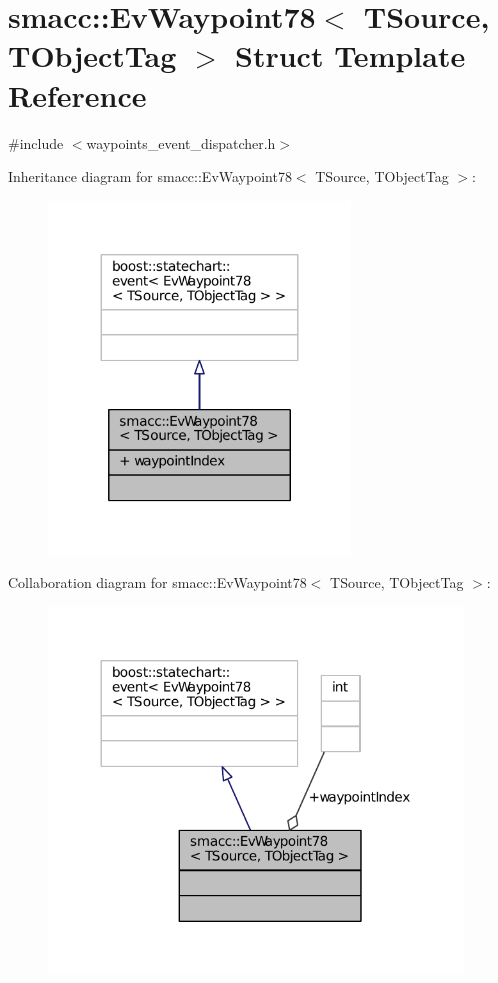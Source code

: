 \hypertarget{structsmacc_1_1EvWaypoint78}{}\section{smacc\+:\+:Ev\+Waypoint78$<$ T\+Source, T\+Object\+Tag $>$ Struct Template Reference}
\label{structsmacc_1_1EvWaypoint78}


{\ttfamily \#include $<$waypoints\+\_\+event\+\_\+dispatcher.\+h$>$}



Inheritance diagram for smacc\+:\+:Ev\+Waypoint78$<$ T\+Source, T\+Object\+Tag $>$\+:
\nopagebreak
\begin{figure}[H]
\begin{center}
\leavevmode
\includegraphics[width=227pt]{structsmacc_1_1EvWaypoint78__inherit__graph}
\end{center}
\end{figure}


Collaboration diagram for smacc\+:\+:Ev\+Waypoint78$<$ T\+Source, T\+Object\+Tag $>$\+:
\nopagebreak
\begin{figure}[H]
\begin{center}
\leavevmode
\includegraphics[width=312pt]{structsmacc_1_1EvWaypoint78__coll__graph}
\end{center}
\end{figure}
